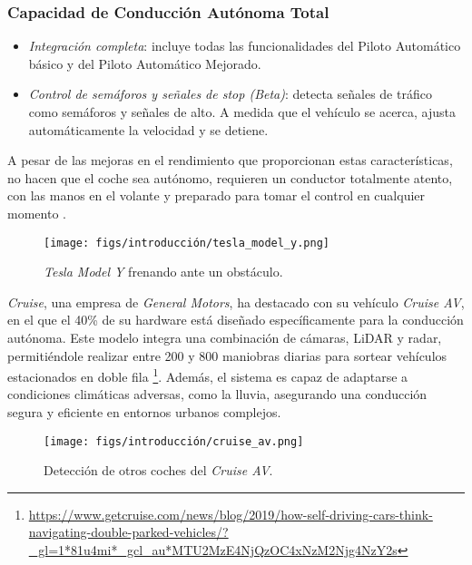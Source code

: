 \subsubsection{Capacidad de Conducción Autónoma Total}

\begin{itemize}
    \item \textit{Integración completa}: incluye todas las funcionalidades del Piloto Automático básico y del Piloto Automático Mejorado.
    \item \textit{Control de semáforos y señales de stop (Beta)}: detecta señales de tráfico como semáforos y señales de alto. A medida que el vehículo se acerca, ajusta automáticamente la velocidad y se detiene.
\end{itemize}

A pesar de las mejoras en el rendimiento que proporcionan estas características, no hacen que el coche sea autónomo, requieren un conductor totalmente atento, con las manos en el volante y preparado para tomar el control en cualquier momento \cite{tesla-autopilot}.

\begin{figure}[ht]
  \begin{center}
    \texttt{[image: figs/introducción/tesla\_model\_y.png]}
  \end{center}
  \caption{\textit{Tesla Model Y} frenando ante un obstáculo.}
  \label{tesla}
\end{figure}

\textit{Cruise}, una empresa de \textit{General Motors}, ha destacado con su vehículo \textit{Cruise AV}, en el que el 40\% de su hardware está diseñado específicamente para la conducción autónoma. Este modelo integra una combinación de cámaras, \ac{LiDAR} y radar, permitiéndole realizar entre 200 y 800 maniobras diarias para sortear vehículos estacionados en doble fila \footnote{\url{https://www.getcruise.com/news/blog/2019/how-self-driving-cars-think-navigating-double-parked-vehicles/?_gl=1*81u4mi*_gcl_au*MTU2MzE4NjQzOC4xNzM2Njg4NzY2s}}. Además, el sistema es capaz de adaptarse a condiciones climáticas adversas, como la lluvia, asegurando una conducción segura y eficiente en entornos urbanos complejos.

\begin{figure}[ht]
  \begin{center}
    \texttt{[image: figs/introducción/cruise\_av.png]}
  \end{center}
  \caption{Detección de otros coches del \textit{Cruise AV}.}
  \label{cruise}
\end{figure}

